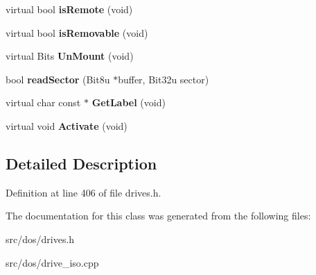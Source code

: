 \begin{DoxyCompactItemize}
\item 
\hypertarget{classisoDrive_a3bf3c53009a3bd8ca3fe822d9ff2487d}{virtual bool {\bfseries is\-Remote} (void)}\label{classisoDrive_a3bf3c53009a3bd8ca3fe822d9ff2487d}

\item 
\hypertarget{classisoDrive_ab3a5c7695c171b7132ee2b8d08ebcd64}{virtual bool {\bfseries is\-Removable} (void)}\label{classisoDrive_ab3a5c7695c171b7132ee2b8d08ebcd64}

\item 
\hypertarget{classisoDrive_ad58ab0d475eec136f5738b4ac8d33136}{virtual Bits {\bfseries Un\-Mount} (void)}\label{classisoDrive_ad58ab0d475eec136f5738b4ac8d33136}

\item 
\hypertarget{classisoDrive_a4e6ef7d78f8bc93437a216f1b88b3d43}{bool {\bfseries read\-Sector} (Bit8u $\ast$buffer, Bit32u sector)}\label{classisoDrive_a4e6ef7d78f8bc93437a216f1b88b3d43}

\item 
\hypertarget{classisoDrive_acf1acbf5887b1d557589ea6eb1301a07}{virtual char const $\ast$ {\bfseries Get\-Label} (void)}\label{classisoDrive_acf1acbf5887b1d557589ea6eb1301a07}

\item 
\hypertarget{classisoDrive_a13b831240141955fb769a1d7b3dca700}{virtual void {\bfseries Activate} (void)}\label{classisoDrive_a13b831240141955fb769a1d7b3dca700}

\end{DoxyCompactItemize}


\subsection{Detailed Description}


Definition at line 406 of file drives.\-h.



The documentation for this class was generated from the following files\-:\begin{DoxyCompactItemize}
\item 
src/dos/drives.\-h\item 
src/dos/drive\-\_\-iso.\-cpp\end{DoxyCompactItemize}
